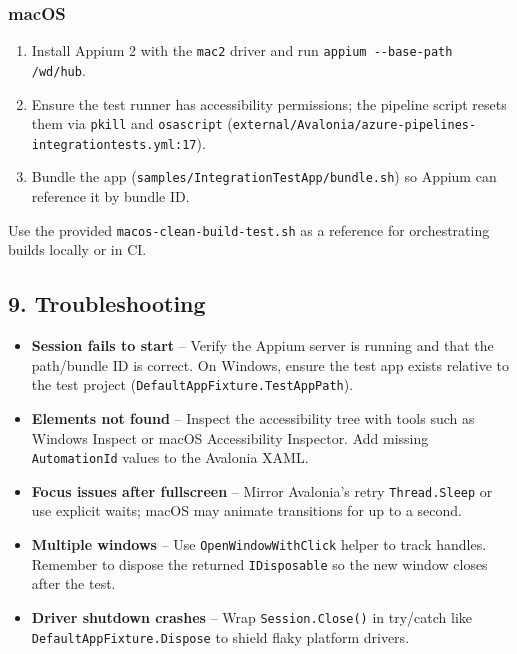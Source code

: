 \subsubsection{macOS}\label{macos-3}

\begin{enumerate}
\def\labelenumi{\arabic{enumi}.}
\tightlist
\item
  Install Appium 2 with the \passthrough{\lstinline!mac2!} driver and
  run \passthrough{\lstinline!appium --base-path /wd/hub!}.
\item
  Ensure the test runner has accessibility permissions; the pipeline
  script resets them via \passthrough{\lstinline!pkill!} and
  \passthrough{\lstinline!osascript!}
  (\passthrough{\lstinline!external/Avalonia/azure-pipelines-integrationtests.yml:17!}).
\item
  Bundle the app
  (\passthrough{\lstinline!samples/IntegrationTestApp/bundle.sh!}) so
  Appium can reference it by bundle ID.
\end{enumerate}

Use the provided \passthrough{\lstinline!macos-clean-build-test.sh!} as
a reference for orchestrating builds locally or in CI.

\subsection{9. Troubleshooting}\label{troubleshooting-6}

\begin{itemize}
\tightlist
\item
  \textbf{Session fails to start} -- Verify the Appium server is running
  and that the path/bundle ID is correct. On Windows, ensure the test
  app exists relative to the test project
  (\passthrough{\lstinline!DefaultAppFixture.TestAppPath!}).
\item
  \textbf{Elements not found} -- Inspect the accessibility tree with
  tools such as Windows Inspect or macOS Accessibility Inspector. Add
  missing \passthrough{\lstinline!AutomationId!} values to the Avalonia
  XAML.
\item
  \textbf{Focus issues after fullscreen} -- Mirror Avalonia's retry
  \passthrough{\lstinline!Thread.Sleep!} or use explicit waits; macOS
  may animate transitions for up to a second.
\item
  \textbf{Multiple windows} -- Use
  \passthrough{\lstinline!OpenWindowWithClick!} helper to track handles.
  Remember to dispose the returned \passthrough{\lstinline!IDisposable!}
  so the new window closes after the test.
\item
  \textbf{Driver shutdown crashes} -- Wrap
  \passthrough{\lstinline!Session.Close()!} in try/catch like
  \passthrough{\lstinline!DefaultAppFixture.Dispose!} to shield flaky
  platform drivers.
\end{itemize}

